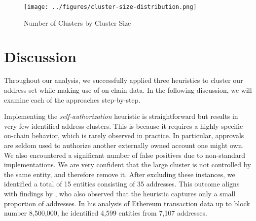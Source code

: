\documentclass[12pt,a4paper,titlepage,oneside,english]{article}
\begin{document}
\begin{figure}[h]
	\centering
	\texttt{[image: ../figures/cluster-size-distribution.png]}
	\caption{Number of Clusters by Cluster Size}
	\label{fig:barplot_clusters}
\end{figure}



\section{Discussion}


Throughout our analysis, we successfully applied three heuristics to cluster our address set while making use of on-chain data. In the following discussion, we will examine each of the approaches step-by-step.

Implementing the \textit{self-authorization} heuristic is straightforward but results in very few identified address clusters. This is because it requires a highly specific on-chain behavior, which is rarely observed in practice. In particular, approvals are seldom used to authorize another externally owned account one might own. We also encountered a significant number of false positives due to non-standard implementations. We are very confident that the large cluster is not controlled by the same entity, and therefore remove it. After excluding these instances, we identified a total of 15 entities consisting of 35 addresses. This outcome aligns with findings by \cite{FV:17}, who also observed that the heuristic captures only a small proportion of addresses. In his analysis of Ethereum transaction data up to block number 8,500,000, he identified 4,599 entities from 7,107 addresses.
\end{document}
